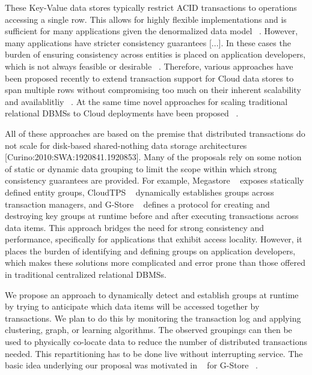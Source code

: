 \documentclass[10pt,final,journal]{IEEEtran}
\begin{document}
These Key-Value data stores typically restrict ACID transactions to operations accessing a single row.  This allows for highly flexible implementations and is sufficient for many applications given the denormalized data model ~\cite{Agrawal:2010}. However, many applications have stricter consistency guarantees [...]. In these cases the burden of ensuring consistency across entities is placed on application developers, which is not always feasible or desirable ~\cite{Bernstein:2011:AMS:2004686.2005651}. Therefore, various approaches have been proposed recently  to extend transaction support for Cloud data stores to span multiple rows without compromising too much on their inherent scalability and availablitliy ~\cite{Baker:2011:8530095, Das:2010:GSD:1807128.1807157, Junqueira:2011:LTS:2056318.2057148, Levandoski:2011:8530161, Zhou:2011:5740834, Peng:2010:LIP:1924943.1924961, Zhang:2010:5697970}. At the same time novel approaches for scaling traditional relational DBMSs to Cloud deployments have been proposed ~\cite{Bernstein:2011:AMS:2004686.2005651, Curino:2011:JPMWMBZ11}. 

All of these approaches are based on the premise that distributed transactions do not scale for disk-based shared-nothing data storage architectures [Curino:2010:SWA:1920841.1920853]. Many of the proposals rely on some notion of static or dynamic data grouping to limit the scope within which strong consistency guarantees are provided. For example, Megastore ~\cite{Baker:2011:8530095} exposes statically defined entity groups, CloudTPS ~\cite{Zhou:2011:5740834} dynamically establishes groups across transaction managers, and G-Store ﻿~\cite{Das:2010:GSD:1807128.1807157} defines a protocol for creating and destroying key groups at runtime before and after executing transactions across data items. This approach bridges the need for strong consistency and performance, specifically for applications that exhibit access locality. However, it places the burden of identifying and defining groups on application developers, which makes these solutions more complicated and error prone than those offered in traditional centralized relational DBMSs.

We propose an approach to dynamically detect and establish groups at runtime by trying to anticipate which data items will be accessed together by transactions. We plan to do this by monitoring the transaction log and applying clustering, graph, or learning algorithms. The observed groupings can then be used to physically co-locate data to reduce the number of distributed transactions needed. This repartitioning has to be done live without interrupting service. The basic idea underlying our proposal was motivated in ~\cite{Das:2011} for G-Store ﻿~\cite{Das:2010:GSD:1807128.1807157}.
\end{document}
